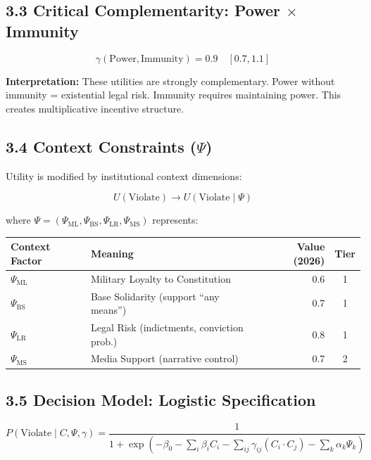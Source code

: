 \documentclass[11pt]{article}
\begin{document}
\subsection{3.3 Critical Complementarity: Power $\times$ Immunity}

\begin{equation}
\gamma(\text{Power}, \text{Immunity}) = 0.9 \quad [0.7, 1.1]
\end{equation}

\textbf{Interpretation:} These utilities are strongly complementary. Power without immunity = existential legal risk. Immunity requires maintaining power. This creates multiplicative incentive structure.

\subsection{3.4 Context Constraints ($\Psi$)}

Utility is modified by institutional context dimensions:

\begin{equation}
U(\text{Violate}) \to U(\text{Violate} \mid \Psi)
\end{equation}

where $\Psi = (\Psi_{\text{ML}}, \Psi_{\text{BS}}, \Psi_{\text{LR}}, \Psi_{\text{MS}})$ represents:

\begin{table}[h]
\centering
\begin{tabular}{|l|l|r|c|}
\hline
\textbf{Context Factor} & \textbf{Meaning} & \textbf{Value (2026)} & \textbf{Tier} \\
\hline
$\Psi_{\text{ML}}$ & Military Loyalty to Constitution & 0.6 & 1 \\
$\Psi_{\text{BS}}$ & Base Solidarity (support ``any means'') & 0.7 & 1 \\
$\Psi_{\text{LR}}$ & Legal Risk (indictments, conviction prob.) & 0.8 & 1 \\
$\Psi_{\text{MS}}$ & Media Support (narrative control) & 0.7 & 2 \\
\hline
\end{tabular}
\end{table}

\subsection{3.5 Decision Model: Logistic Specification}

\begin{equation}
P(\text{Violate} \mid C, \Psi, \gamma) = \frac{1}{1 + \exp\left(-\beta_0 - \sum_i \beta_i C_i - \sum_{ij} \gamma_{ij}(C_i \cdot C_j) - \sum_k \alpha_k \Psi_k\right)}
\end{equation}
\end{document}
